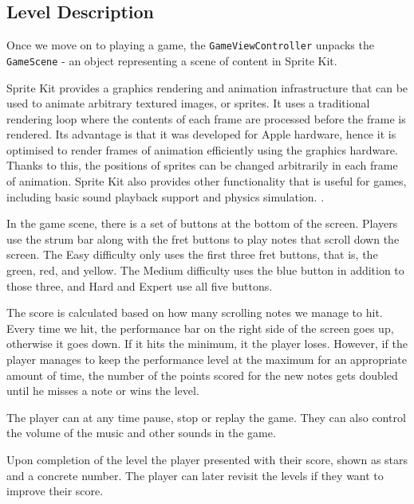 \vspace{10pt}

\subsection{Level Description}

Once we move on to playing a game, the \verb|GameViewController| unpacks the \verb|GameScene| - an object representing a scene of content in Sprite Kit.

Sprite Kit provides a graphics rendering and animation infrastructure that can be used to animate arbitrary textured images, or sprites. It uses a traditional rendering loop where the contents of each frame are processed before the frame is rendered. Its advantage is that it was developed for Apple hardware, hence it is optimised to render frames of animation efficiently using the graphics hardware. Thanks to this, the positions of sprites can be changed arbitrarily in each frame of animation. Sprite Kit also provides other functionality that is useful for games, including basic sound playback support and physics simulation. \cite{spritekit}. 

In the game scene, there is a set of buttons at the bottom of the screen. Players use the strum bar along with the fret buttons to play notes that scroll down the screen. The Easy difficulty only uses the first three fret buttons, that is, the green, red, and yellow. The Medium difficulty uses the blue button in addition to those three, and Hard and Expert use all five buttons.

The score is calculated based on how many scrolling notes we manage to hit. Every time we hit, the performance bar on the right side of the screen goes up, otherwise it goes down. If it hits the minimum, it the player loses. However, if the player manages to keep the performance level at the maximum for an appropriate amount of time, the number of the points scored for the new notes gets doubled until he misses a note or wins the level.

The player can at any time pause, stop or replay the game. They can also control the volume of the music and other sounds in the game. 

Upon completion of the level the player presented with their score, shown as stars and a concrete number. The player can later revisit the levels if they want to improve their score. 

\vspace{10pt}

